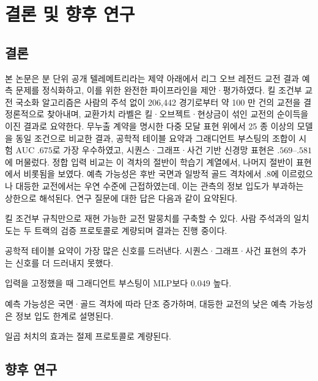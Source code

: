 \chapter{결론 및 향후 연구}
\label{ch:conclusion}

\section{결론}

본 논문은 분 단위 공개 텔레메트리라는 제약 아래에서 리그 오브 레전드 교전 결과 예측 문제를 정식화하고, 이를 위한 완전한 파이프라인을 제안·평가하였다. 킬 조건부 교전 국소화 알고리즘은 사람의 주석 없이 206{,}442 경기로부터 약 100 만 건의 교전을 결정론적으로 찾아내며, 교환가치 라벨은 킬·오브젝트·현상금이 섞인 교전의 순이득을 이진 결과로 요약한다. 무누출 계약을 명시한 다중 모달 표현 위에서 25 종 이상의 모델을 동일 조건으로 비교한 결과, 공학적 테이블 요약과 그래디언트 부스팅의 조합이 시험 AUC $.675$로 가장 우수하였고, 시퀀스·그래프·사건 기반 신경망 표현은 $.569$--$.581$에 머물렀다. 정합 입력 비교는 이 격차의 절반이 학습기 계열에서, 나머지 절반이 표현에서 비롯됨을 보였다. 예측 가능성은 후반 국면과 일방적 골드 격차에서 $.8$에 이르렀으나 대등한 교전에서는 우연 수준에 근접하였는데, 이는 관측의 정보 입도가 부과하는 상한으로 해석된다. 연구 질문에 대한 답은 다음과 같이 요약된다.

\begin{description}[leftmargin=3.2em,style=nextline]
  \item[RQ1] 킬 조건부 규칙만으로 재현 가능한 교전 말뭉치를 구축할 수 있다. 사람 주석과의 일치도는 두 트랙의 검증 프로토콜로 계량되며 결과는 진행 중이다.
  \item[RQ2] 공학적 테이블 요약이 가장 많은 신호를 드러낸다. 시퀀스·그래프·사건 표현의 추가는 신호를 더 드러내지 못했다.
  \item[RQ3] 입력을 고정했을 때 그래디언트 부스팅이 MLP보다 $0.049$ 높다.
  \item[RQ4] 예측 가능성은 국면·골드 격차에 따라 단조 증가하며, 대등한 교전의 낮은 예측 가능성은 정보 입도 한계로 설명된다.
  \item[RQ5] 일곱 처치의 효과는 절제 프로토콜로 계량된다. 
\end{description}

\section{향후 연구}


